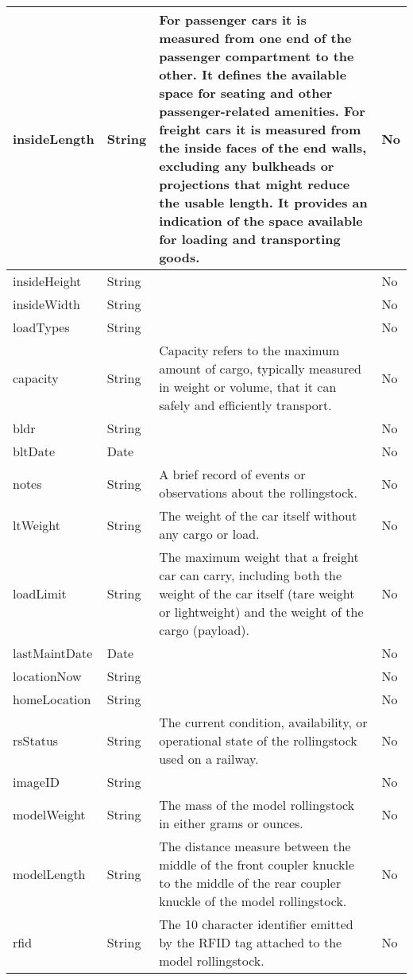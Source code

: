 \begin{longtable}{|L{3cm}|L{1.7cm}|L{9.1cm}|L{1.0cm}|}
	insideLength & String & For passenger cars it is measured from one end of the passenger compartment to the other. It defines the available space for seating and other passenger-related amenities. For freight cars it is measured from the inside faces of the end walls, excluding any bulkheads or projections that might reduce the usable length. It provides an indication of the space available for loading and transporting goods. & No \\ \hline
	insideHeight & String &  & No \\ \hline
	insideWidth & String &  & No \\ \hline
	loadTypes & String &  & No \\ \hline
	capacity & String & Capacity refers to the maximum amount of cargo, typically measured in weight or volume, that it can safely and efficiently transport. & No \\ \hline
	bldr & String &  & No \\ \hline
	bltDate & Date &  & No \\ \hline
	notes & String & A brief record of events or observations about the rollingstock. & No \\ \hline
	ltWeight & String & The weight of the car itself without any cargo or load. & No \\ \hline
	loadLimit & String & The maximum weight that a freight car can carry, including both the weight of the car itself (tare weight or lightweight) and the weight of the cargo (payload). & No \\ \hline
	lastMaintDate & Date &  & No \\ \hline
	locationNow & String &  & No \\ \hline
	homeLocation & String &  & No \\ \hline
	rsStatus & String & The current condition, availability, or operational state of the rollingstock used on a railway. & No \\ \hline
	imageID & String &  & No \\ \hline
	modelWeight & String & The mass of the model rollingstock in either grams or ounces. & No \\ \hline
	modelLength & String & The distance measure between the middle of the front coupler knuckle to the middle of the rear coupler knuckle of the model rollingstock. & No \\ \hline
	rfid & String & The 10 character identifier emitted by the RFID tag attached to the model rollingstock. & No \\ \hline
    \end{longtable}
